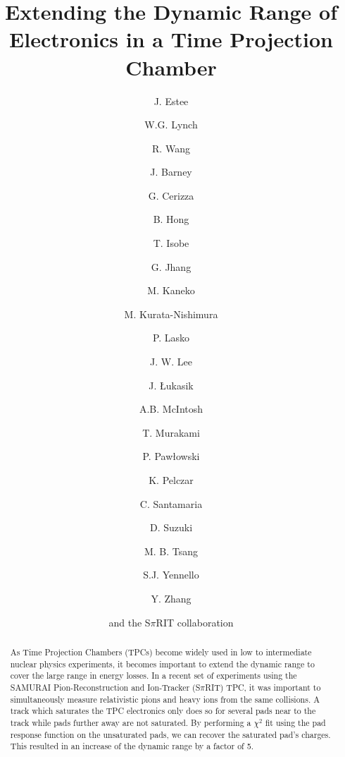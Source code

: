 \documentclass[review]{elsarticle}
\begin{document}
\begin{frontmatter}

\title{Extending the Dynamic Range of Electronics in a Time Projection Chamber}


\author[msu,nscl]{J. Estee}
\author[msu,nscl]{W.G. Lynch}
\author[china1,china2]{R. Wang}
\author[msu,nscl]{J. Barney}
\author[msu,nscl]{G. Cerizza}
\author[kor]{B. Hong}
\author[riken]{T. Isobe}
\author[nscl]{G. Jhang}
\author[kyoto]{M. Kaneko}
\author[riken]{M. Kurata-Nishimura}
\author[krakow]{P. Lasko}
\author[kor]{J. W. Lee}
\author[krakow]{J. \L ukasik}
\author[a&m]{A.B. McIntosh}
\author[kyoto]{T. Murakami}
\author[krakow]{P. Paw\l owski}
\author[poland]{K. Pelczar}
\author[nscl]{C. Santamaria}
\author[riken]{D. Suzuki}
\author[nscl]{M. B. Tsang}
\author[a&m]{S.J. Yennello}
\author[tsing]{Y. Zhang}
\author[]{and the S$\pi$RIT collaboration}

\address[msu]{Dept. Physics and Astronomy, Michigan State University, East Lansing, Michigan, 48824, USA }
\address[nscl]{National Superconducting Cyclotron Laboratory, East Lansing, Michigan, 48824, USA}
\address[kor]{Department of Physics, Korea University, Seoul 136-703, Republic of Korea }
\address[riken]{RIKEN Nishina Center, Hirosawa 2-1, Wako, Saitama 351‐0198, Japan }
\address[kyoto]{Department of Physics, Kyoto University, Kita-shirakawa, Kyoto 606-8502, Japan }
\address[krakow]{Institute of Nuclear Physics PAN, ul. Radzikowskiego 15231-342 Krak\'{o}w, Poland}
\address[a&m]{Dept. of Physics and Astronomy, Texas A$\&$M University, College Station, TX 77843, USA }
\address[tsing]{Department of Physics, Tsinghua University, Beijing 100084, P. R. China}
\address[poland]{Faculty of Physics, Astronomy and Applied Computer Science, Jagiellonian University, ul. Go\l \k{e}bia 24, 31-007 Krak\'{o}w}
\address[china1]{State Key Laboratory of Radiation Medicine and Protection, School of Radiation Medicine and Protection, Soochow University, Suzhou 215123, China}
\address[china2]{Collaborative Innovation Center of Radiological Medicine of Jiangsu Higher Education Institutions, Suzhou 215123, China}



\begin{abstract}
As Time Projection Chambers (TPCs) become widely used in low to intermediate nuclear physics experiments,  it becomes important to extend the dynamic range to cover  the large range in energy losses. In a recent set of experiments using the SAMURAI Pion-Reconstruction and Ion-Tracker (S$\pi$RIT) TPC, it was important to simultaneously measure relativistic pions and heavy ions from the same collisions. A track which saturates the TPC electronics only does so for several pads near to the track while pads further away are not saturated. By performing a $\chi^2$ fit using the pad response function on the unsaturated pads, we can recover the saturated pad's charges. This resulted in an increase of the dynamic range by a factor of 5. 
\end{abstract}


\end{frontmatter}
\end{document}
